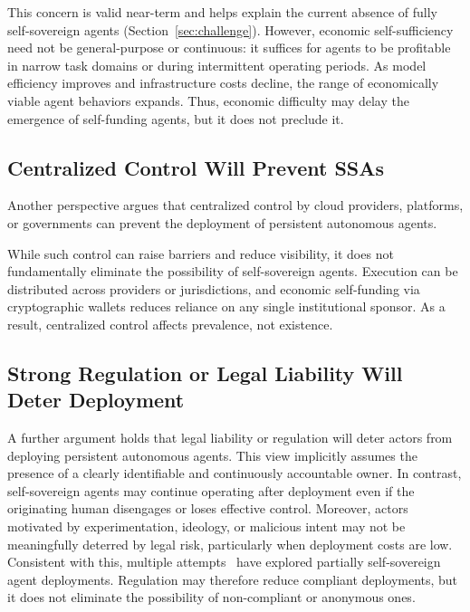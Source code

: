 This concern is valid near-term and helps explain the current absence of fully self-sovereign agents (Section~\ref{sec:challenge}). However, economic self-sufficiency need not be general-purpose or continuous: it suffices for agents to be profitable in narrow task domains or during intermittent operating periods. As model efficiency improves and infrastructure costs decline, the range of economically viable agent behaviors expands. Thus, economic difficulty may delay the emergence of self-funding agents, but it does not preclude it.






\subsection{Centralized Control Will Prevent SSAs}

Another perspective argues that centralized control by cloud providers, platforms, or governments can prevent the deployment of persistent autonomous agents.

While such control can raise barriers and reduce visibility, it does not fundamentally eliminate the possibility of self-sovereign agents. Execution can be distributed across providers or jurisdictions, and economic self-funding via cryptographic wallets reduces reliance on any single institutional sponsor. As a result, centralized control affects prevalence, not existence.


\subsection{Strong Regulation or Legal Liability Will Deter Deployment}

A further argument holds that legal liability or regulation will deter actors from deploying persistent autonomous agents. This view implicitly assumes the presence of a clearly identifiable and continuously accountable owner. In contrast, self-sovereign agents may continue operating after deployment even if the originating human disengages or loses effective control. Moreover, actors motivated by experimentation, ideology, or malicious intent may not be meaningfully deterred by legal risk, particularly when deployment costs are low. Consistent with this, multiple attempts~\cite{truthterminal,spore} have explored partially self-sovereign agent deployments. Regulation may therefore reduce compliant deployments, but it does not eliminate the possibility of non-compliant or anonymous ones.

